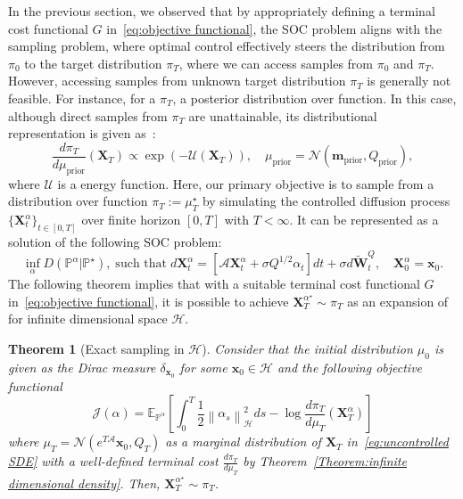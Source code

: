 \documentclass[nohyperref]{article}
\theoremstyle{plain}
\newtheorem{theorem}{Theorem}[section]
\theoremstyle{remark}
\newcommand{\mc}{\mathcal}
\newcommand{\mb}{\mathbf}
\newcommand{\norm}[1]{\left\lVert#1\right\rVert}
\begin{document}
In the previous section, we observed that by appropriately defining a terminal cost functional $G$ in~\eqref{eq:objective functional}, the SOC problem aligns with the sampling problem, where optimal control effectively steers the distribution from $\pi_{0}$ to the target distribution $\pi_{T}$, where we can access samples from $\pi_0$ and $\pi_T$. However, accessing samples from unknown target distribution $\pi_T$ is generally not feasible. For instance, for a $\pi_T$, a posterior distribution over function. In this case, although direct samples from $\pi_T$ are unattainable, its distributional representation is given as~\citep{suzuki2020generalization, baldassari2024conditional}:
\begin{equation}\label{eq:posterior measure}
    \frac{d\pi_T}{d\mu_{\text{prior}}}(\mb{X}_T) \propto \exp\left(-\mc{U}(\mb{X}_T)\right), \quad \mu_{\text{prior}} = \mc{N}(\mb{m}_{\text{prior}}, Q_{\text{prior}}),
\end{equation}
where $\mc{U}$ is a energy function. Here, our primary objective is to sample from a distribution over function $\pi_T := \mu^{\star}_T$ by simulating the controlled diffusion process $\{\mb{X}_t^{\alpha}\}_{t \in [0, T]}$ over finite horizon $[0, T]$ with $T < \infty$. It can be represented as a solution of the following SOC problem:
\begin{equation}\label{eq:bayesian learning problem}
\inf_{\alpha}D(\mathbb{P}^{\alpha}|\mathbb{P}^{\star}), \; \text{such that} \;  d\mb{X}^{\alpha}_t = \left[ \mc{A}\mb{X}^{\alpha}_t  + \sigma Q^{1/2}\alpha_t \right] dt + \sigma d\mb{\tilde{W}}^Q_t, \quad \mb{X}^{\alpha}_0 = \mb{x}_0.
\end{equation}
The following theorem implies that with a suitable terminal cost functional $G$ in~\eqref{eq:objective functional}, it is possible to achieve $\mb{X}^{\alpha^{\star}}_T \sim \pi_T$ as an expansion of~\citep{Pra1991ASC,tzen2019theoretical} for infinite dimensional space $\mc{H}$.
\begin{theorem}[Exact sampling in $\mc{H}$]\label{theorem:exact sampling} Consider that the initial distribution $\mu_0$ is given as the Dirac measure $\delta_{\mb{x}_0}$ for some $\mb{x}_0 \in \mc{H}$ and the following objective functional
\begin{equation}\label{eq:objective function exact sampling}
    \mc{J}(\alpha) = \mathbb{E}_{\mathbb{P}^{\alpha}}\left[ \int_0^T \frac{1}{2}\norm{\alpha_s}_{\mc{H}}^2 ds - \log \frac{d\pi_T}{d\mu_T}(\mb{X}^{\alpha}_T) \right]
\end{equation}
where $\mu_T = \mc{N}(e^{T\mc{A}}\mb{x}_0, Q_T)$ as a marginal distribution of $\mb{X}_T$ in~\eqref{eq:uncontrolled SDE} with a well-defined terminal cost $\frac{d\pi_T}{d\mu_T}$ by Theorem~\ref{Theorem:infinite dimensional density}. Then, $\mb{X}^{\alpha^{\star}}_T \sim \pi_T$.
\end{theorem}
\end{document}
